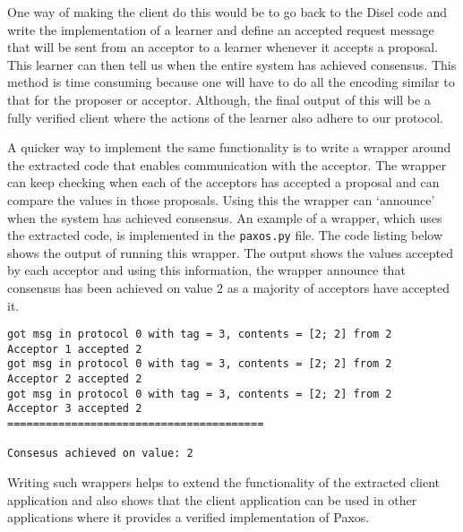 One way of making the client do this would be to go back to the Disel code and
write the implementation of a learner and define an \textsf{accepted request} message that will
be sent from an acceptor to a learner whenever it accepts a proposal. This learner
can then tell us when the entire system has achieved consensus. This method is
time consuming because one will have to do all the encoding similar to that for
the proposer or acceptor. Although, the final output of this will be a fully
verified client where the actions of the learner also adhere to our protocol.

A quicker way to implement the same functionality is to write a
wrapper around the extracted code that enables communication with the
acceptor. The wrapper can keep checking when each of the acceptors has accepted
a proposal and can compare the values in those proposals. Using this the wrapper
can `announce' when the system has achieved consensus. An example of a wrapper, which
uses the extracted code, is implemented in the \texttt{paxos.py} file. The code
listing below shows the output of running this wrapper. The output shows
the values accepted by each acceptor and using this information, the wrapper
announce that consensus has been achieved on value $2$ as a majority of
acceptors have accepted it.

\begin{lstlisting}
got msg in protocol 0 with tag = 3, contents = [2; 2] from 2
Acceptor 1 accepted 2
got msg in protocol 0 with tag = 3, contents = [2; 2] from 2
Acceptor 2 accepted 2
got msg in protocol 0 with tag = 3, contents = [2; 2] from 2
Acceptor 3 accepted 2
========================================

Consesus achieved on value: 2
\end{lstlisting}


Writing such wrappers helps to extend the functionality of the extracted
client application and also shows that the client application can be used in
other applications where it provides a verified implementation of Paxos.


